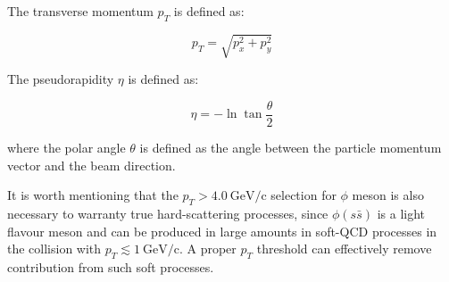 \documentclass[10pt,twocolumn]{article}
\newcommand*{\GeVc}{~\text{GeV/c}}
\begin{document}
The transverse momentum $p_T$ is defined as:

\begin{equation}
    p_T = \sqrt{p_x^2 + p_y^2}
\end{equation}

The pseudorapidity $\eta$ is defined as:

\begin{equation}
    \eta = -\ln \tan \frac{\theta}{2}
\end{equation}

where the polar angle $\theta$ is defined as the angle between the particle momentum vector and the beam direction.

It is worth mentioning that the $p_T > 4.0\GeVc$ selection for $\phi$ meson is also necessary to warranty true hard-scattering processes, since $\phi(s\bar{s})$ is a light flavour meson and can be produced in large amounts in soft-QCD processes in the collision with $p_T\lesssim 1\GeVc$. A proper $p_T$ threshold can effectively remove contribution from such soft processes.
\end{document}
